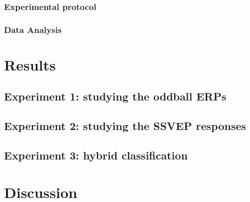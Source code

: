 \documentclass[10pt]{article}
\begin{document}
        \subsubsection{Experimental protocol}
        \label{sec:2.4.1Protocol}

        \subsubsection{Data Analysis}
        \label{sec:2.4.2Analysis}

\section{Results}
\label{sec:3Results}

    \subsection{Experiment 1: studying the oddball \acsp{ERP}}
    \label{sec:2.2Oddball}


    \subsection{Experiment 2: studying the \acs{SSVEP} responses}
    \label{sec:2.3SSVEP}


    \subsection{Experiment 3: hybrid classification}
    \label{sec:2.4Hybrid}


\section{Discussion}
\label{sec:4Discuss}

\end{document}
